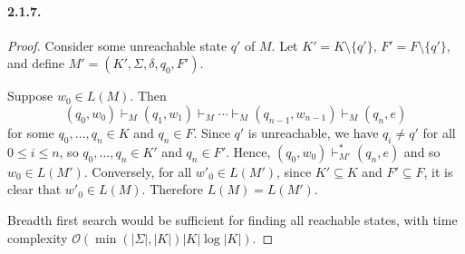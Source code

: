 \documentclass{article}
\begin{document}
\paragraph{2.1.7.}
\begin{proof}
  Consider some unreachable state $q'$ of $M$. Let $K' = K \setminus \{q'\}$,
  $F' = F \setminus \{q'\}$, and define $M' = (K', \Sigma, \delta, q_0, F')$.
  
  Suppose $w_0 \in L(M)$. Then \[
    (q_0, w_0) \vdash_M (q_1, w_1) \vdash_M \cdots \vdash_M (q_{n-1}, w_{n-1})
    \vdash_M (q_n, e)
  \] for some $q_0, \ldots, q_n \in K$ and $q_n \in F$. Since $q'$ is
  unreachable, we have $q_i \neq q'$ for all $0 \leq i \leq n$, so $q_0, \ldots,
  q_n \in K'$ and $q_n \in F'$. Hence, $(q_0, w_0) \vdash_{M'}^* (q_n, e)$ and
  so $w_0 \in L(M')$. Conversely, for all $w'_0 \in L(M')$, since $K' \subseteq
  K$ and $F' \subseteq F$, it is clear that $w'_0 \in L(M)$. Therefore $L(M) =
  L(M')$.

  Breadth first search would be sufficient for finding all reachable states,
  with time complexity $\mathcal{O}(\min(|\Sigma|, |K|)|K|\log|K|)$.
\end{proof}
\end{document}
